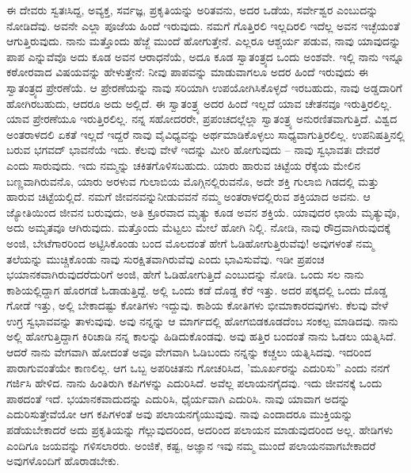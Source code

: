 ಈ ದೇವರು ಸ್ವತಃಸಿದ್ದ, ಅವ್ಯಕ್ತ, ಸರ್ವಜ್ಞ, ಪ್ರಕೃತಿಯನ್ನು ಅರಿತವನು, ಅದರ ಒಡೆಯ, ಸರ್ವೇಶ್ವರ ಎಂಬುದನ್ನು ನೋಡಿದೆವು. ಅವನೇ ಎಲ್ಲಾ ಪೂಜೆಯ ಹಿಂದೆ ಇರುವುದು. ನಮಗೆ ಗೊತ್ತಿರಲಿ ಇಲ್ಲದಿರಲಿ ಇದೆಲ್ಲ ಅವನ ಇಚ್ಛೆಯಂತೆ ಆಗುತ್ತಿರುವುದು. ನಾನು ಮತ್ತೊಂದು ಹೆಜ್ಜೆ ಮುಂದೆ ಹೋಗುತ್ತೇನೆ. ಎಲ್ಲರೂ ಆಶ್ಚರ್ಯ ಪಡುವ, ನಾವು ಯಾವುದನ್ನು ಪಾಪ ಎನ್ನುವೆವೊ ಅದು ಕೂಡ ಅವನ ಆರಾಧನೆಯೆ, ಅದೂ ಕೂಡ ಸ್ವಾತಂತ್ರ್ಯದ ಒಂದು ಅಂಶವೇ. ಇಲ್ಲಿ ನಾನು ಇನ್ನೂ ಕಠೋರವಾದ ವಿಷಯವನ್ನು ಹೇಳುತ್ತೇನೆ: ನೀವು ಪಾಪವನ್ನು ಮಾಡುವಾಗಲೂ ಅದರ ಹಿಂದೆ ಇರುವುದು ಈ ಸ್ವಾತಂತ್ರ್ಯದ ಪ್ರೇರಣೆಯೆ. ಆ ಪ್ರೇರಣೆಯನ್ನು ನಾವು ಸರಿಯಾಗಿ ಉಪಯೋಗಿಸಿಕೊಳ್ಳದೆ ಇರಬಹುದು, ನಾವು ಅಡ್ಡದಾರಿಗೆ ಹೋಗಿರಬಹುದು, ಆದರೂ ಅದು ಅಲ್ಲಿದೆ. ಈ ಸ್ವಾತಂತ್ರ್ಯ ಅದರ ಹಿಂದೆ ಇಲ್ಲದೆ ಯಾವ ಚೇತನವೂ ಇರುತ್ತಿರಲಿಲ್ಲ. ಯಾವ ಪ್ರೇರಣೆಯೂ ಇರುತ್ತಿರಲಿಲ್ಲ. ನನ್ನ ಸಹೋದರರೇ, ಪ್ರಪಂಚದಲ್ಲೆಲ್ಲಾ ಸ್ವಾತಂತ್ರ್ಯ ಅನುರಣಿತವಾಗುತ್ತಿದೆ. ವಿಶ್ವದ ಅಂತರಾಳದಲಿ ಏಕತೆ ಇಲ್ಲದೆ ಇದ್ದರೆ ನಾವು ವೈವಿಧ್ಯವನ್ನು ಅರ್ಥಮಾಡಿಕೊಳ್ಳಲು ಸಾಧ್ಯವಾಗುತ್ತಿರಲಿಲ್ಲ. ಉಪನಿಷತ್ತಿನಲ್ಲಿ ಬರುವ ಭಗವದ್ ಭಾವನೆಯೆ ಇದು. ಕೆಲವು ವೇಳೆ ಇದನ್ನು ಮೀರಿ ಹೋಗುವುದು – ನಾವು ಸ್ವಭಾವತಃ ದೇವರೆ ಎಂದು ಸಾರುವುದು. ಇದು ನಮ್ಮನ್ನು ಚಕಿತಗೊಳಿಸಬಹುದು. ಯಾರು ಹಾರುವ ಚಿಟ್ಟೆಯ ರೆಕ್ಕೆಯ ಮೇಲಿನ ಬಣ್ಣವಾಗಿರುವನೊ, ಯಾರು ಅರಳುವ ಗುಲಾಬಿಯ ಮೊಗ್ಗಿನಲ್ಲಿರುವನೊ, ಅದೇ ಶಕ್ತಿ ಗುಲಾಬಿ ಗಿಡದಲ್ಲಿ ಮತ್ತು ಹಾರುವ ಚಿಟ್ಟೆಯಲ್ಲಿದೆ. ನಮಗೆ ಜೀವನವನ್ನುನೀಡುವವನೆ ನಮ್ಮ ಅಂತರಾಳದಲ್ಲಿರುವ ಶಕ್ತಿಯಾದ ಅವನು. ಆ ಜ್ಯೋತಿಯಿಂದ ಜೀವನ ಬರುವುದು, ಅತಿ ಕ್ರೂರವಾದ ಮೃತ್ಯು ಕೂಡ ಅವನ ಶಕ್ತಿಯೆ. ಯಾವುದರ ಛಾಯೆ ಮೃತ್ಯುವೊ, ಅದು ಅಮೃತವೂ ಆಗಿರುವುದು. ಮತ್ತೊಂದು ಮೆಟ್ಟಲು ಮೇಲೆ ಹೋಗಿ ನಿಲ್ಲಿ. ನೋಡಿ, ನಾವು ರೌದ್ರವಾಗಿರುವುದಕ್ಕೆ ಅಂಜಿ, ಬೇಟೆಗಾರರಿಂದ ಅಟ್ಟಿಸಿಕೊಂಡು ಬಂದ ಮೊಲದಂತೆ ಹೇಗೆ ಓಡಿಹೋಗುತ್ತಿರುವೆವು! ಅವುಗಳಂತೆ ನಮ್ಮ ತಲೆಯನ್ನು ಮುಚ್ಚಿಕೊಂಡು ನಾವು ಸುರಕ್ಷಿತವಾಗಿರುವೆವು ಎಂದು ಭಾವಿಸುವೆವು. ಇಡೀ ಪ್ರಪಂಚ ಭಯಾನಕವಾಗಿರುವುದರೆದುರಿಗೆ ಅಂಜಿ, ಹೇಗೆ ಓಡಿಹೋಗುತ್ತಿದೆ ಎಂಬುದನ್ನು ನೋಡಿ. ಒಂದು ಸಲ ನಾನು ಕಾಶಿಯಲ್ಲಿದ್ದಾಗ ಹೊರಗಡೆ ಓಡಾಡುತ್ತಿದ್ದೆ. ಅಲ್ಲಿ ಒಂದು ಕಡೆ ದೊಡ್ಡ ಕೆರೆ ಇತ್ತು. ಅದರ ಪಕ್ಕದಲ್ಲಿ ಒಂದು ದೊಡ್ಡ ಗೋಡೆ ಇತ್ತು, ಅಲ್ಲಿ ಬೇಕಾದಷ್ಟು ಕೋತಿಗಳು ಇದ್ದುವು. ಕಾಶಿಯ ಕೋತಿಗಳು ಭೀಮಾಕಾರದವುಗಳು. ಕೆಲವು ವೇಳೆ ಉಗ್ರ ಸ್ವಭಾವವನ್ನು ತಾಳುವುವು. ಅವು ನನ್ನನ್ನು ಆ ಮಾರ್ಗದಲ್ಲಿ ಹೋಗಬಿಡಕೂಡದೆಂಬ ಸಂಕಲ್ಪ ಮಾಡಿದವು. ನಾನು ಅಲ್ಲಿ ಹೋಗುತ್ತಿದ್ದಾಗ ಕಿರಿಚಾಡಿ ನನ್ನ ಕಾಲನ್ನು ಹಿಡಿದುಕೊಂಡವು. ಅವು ಹತ್ತಿರ ಬಂದಂತೆ ನಾನು ಓಡಲು ಯತ್ನಿಸಿದೆ. ಆದರೆ ನಾನು ವೇಗವಾಗಿ ಹೋದಂತೆ ಅವೂ ವೇಗವಾಗಿ ಓಡಿಬಂದು ನನ್ನನ್ನು ಕಚ್ಚಲು ಯತ್ನಿಸಿದವು. ಇದರಿಂದ ಪಾರಾಗುವಂತೆಯೇ ಕಾಣಲಿಲ್ಲ. ಆಗ ಒಬ್ಬ ಅಪರಿಚಿತನು ಗೋಚರಿಸಿದ, 'ಮೂರ್ಖರನ್ನು ಎದುರಿಸು'' ಎಂದು ನನಗೆ ಗರ್ಜಿಸಿ ಹೇಳಿದ. ನಾನು ಹಿಂತಿರುಗಿ ಕಪಿಗಳನ್ನು ಎದುರಿಸಿದೆ. ಅವೆಲ್ಲ ಪಲಾಯನಗೈದವು. ಇದು ಜೀವನಕ್ಕೆ ಒಂದು ಪಾಠದಂತೆ ಇದೆ. ಭಯಾನಕವಾದುದನ್ನು ಎದುರಿಸಿ, ಧೈರ್ಯವಾಗಿ ಎದುರಿಸಿ. ನಾವು ಯಾವಾಗ ಅದನ್ನು ಎದುರಿಸುತ್ತೇವೆಯೋ ಆಗ ಕಪಿಗಳಂತೆ ಅವು ಪಲಾಯನಗೈಯುವುವು. ನಾವು ಎಂದಾದರೂ ಮುಕ್ತಿಯನ್ನು ಪಡೆಯಬೇಕಾದರೆ ಅದು ಪ್ರಕೃತಿಯನ್ನು ಗೆಲ್ಲುವುದರಿಂದ, ಅದರಿಂದ ಪಲಾಯನ ಮಾಡುವುದರಿಂದ ಅಲ್ಲ. ಹೇಡಿಗಳು ಎಂದಿಗೂ ಜಯವನ್ನು ಗಳಿಸಲಾರರು. ಅಂಜಿಕೆ, ಕಷ್ಟ, ಅಜ್ಞಾನ ಇವು ನಮ್ಮ ಮುಂದೆ ಪಲಾಯನವಾಗಬೇಕಾದರೆ ಅವುಗಳೊಂದಿಗೆ ಹೊರಾಡಬೇಕು.

